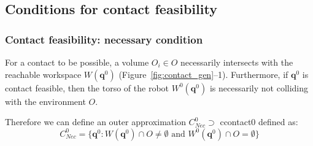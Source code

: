 


   
 
\subsection{Conditions for contact feasibility}




\subsubsection*{Contact feasibility: necessary condition}
For a contact to be possible, a volume $O_i \in O$ necessarily intersects with the reachable workspace $W(\mathbf{q}^{0})$ (Figure~\ref{fig:contact_gen}--1). Furthermore, if $\mathbf{q}^{0}$ is \gls{contact feasible}, then the torso of the robot $W^0(\mathbf{q}^{0})$ is necessarily not colliding  with the environment $O$.

Therefore we can define an outer approximation  $C^0_{Nec} \supset$ \gls{ccontact0} defined as: 
\begin{equation}
C_{Nec}^0 = \{ \mathbf{q}^0 : W(\mathbf{q}^{0}) \cap O \neq \emptyset \text{ and } W^0(\mathbf{q}^{0}) \cap O = \emptyset \} %
\end{equation}
 
